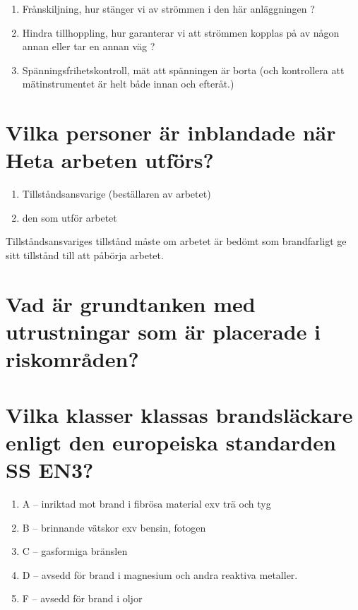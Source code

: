 \documentclass[a4paper,swedish]{article}
\begin{document}
\begin{enumerate}
\item Frånskiljning, hur stänger vi av strömmen i den här anläggningen ?
\item Hindra tillhoppling, hur garanterar vi att strömmen kopplas på av någon annan eller tar en annan väg ?
\item Spänningsfrihetskontroll, mät att spänningen är borta (och kontrollera att mätinstrumentet är helt både innan och efteråt.)
\end{enumerate}

\setcounter{section}{39}
\section{Vilka personer är inblandade när Heta arbeten utförs?}\label{sec:heta_arbeten_roller}

\begin{enumerate}
\item Tillståndsansvarige (beställaren av arbetet)
\item den som utför arbetet
\end{enumerate}

Tillståndsansvariges tillstånd måste om arbetet är bedömt som brandfarligt ge sitt tillstånd till att påbörja arbetet.

\setcounter{section}{41}
\section{Vad är grundtanken med utrustningar som är placerade i riskområden?}

\setcounter{section}{43}
\section{Vilka klasser klassas brandsläckare enligt den europeiska standarden SS EN3?}

\begin{enumerate}
\item A -- inriktad mot brand i fibrösa material exv trä och tyg
\item B -- brinnande vätskor exv bensin, fotogen
\item C -- gasformiga bränslen
\item D -- avsedd för brand i magnesium och andra reaktiva metaller.
\item F -- avsedd för brand i oljor
\end{enumerate}
\end{document}
